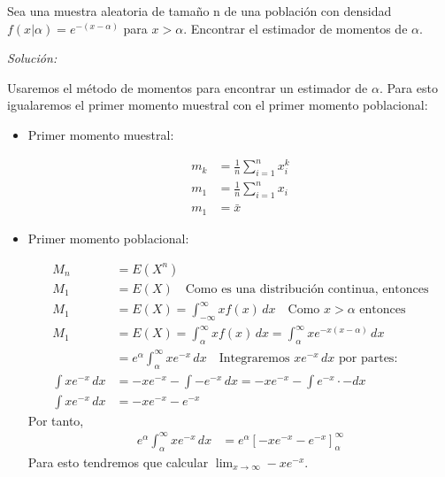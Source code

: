 \documentclass[12pt]{article}
\newenvironment{problem}[2][Problema]{\begin{trivlist}
\item[\hskip \labelsep {\bfseries #1}\hskip \labelsep {\bfseries #2.}]}{\end{trivlist}}
\newenvironment{sol}
    {\emph{Solución:}
    }
    {
    }
\begin{document}




\begin{problem}{I} 
Sea una muestra aleatoria de tamaño n de una población con densidad\\ $f(x|\alpha)=e^{-(x-\alpha)}$ para $x>\alpha$. Encontrar el estimador de momentos de $\alpha$.
\end{problem}
\begin{sol}
Usaremos el método de momentos para encontrar un estimador de $\alpha$. Para esto igualaremos el primer momento muestral con el primer momento poblacional:

\begin{itemize}

\item Primer momento muestral:

\begin{align*}
	m_k &= \frac{1}{n} \sum_{i=1}^{n}x_i^k \\
	m_1 &= \frac{1}{n} \sum_{i=1}^{n}x_i \\
	m_1 &= \bar{x}
\end{align*}
	
\item Primer momento poblacional:

\begin{align*}
    M_n &= E(X^n) \\
    M_1 &= E(X) \quad \text{Como es una distribución continua, entonces} \\
    M_1 &= E(X) = \int_{-\infty}^{\infty} x f(x) \, dx \quad \text{Como }x>\alpha \text{ entonces} \\
    M_1 &= E(X) = \int_{\alpha}^{\infty} x f(x) \, dx = \int_{\alpha}^{\infty} xe^{-x(x-\alpha)} \, dx \\
    &=  e^\alpha \int_{\alpha}^{\infty} xe^{-x} \, dx \quad \text{Integraremos }xe^{-x} \, dx \text{ por partes:} \\
   \int xe^{-x} \, dx  &= -xe^{-x}- \int -e^{-x} \, dx = -xe^{-x}- \int e^{-x} \cdot - dx \\
   \int xe^{-x} \, dx &= -xe^{-x}-e^{-x}
\end{align*}
Por tanto,
\begin{align*}
 e^\alpha \int_{\alpha}^{\infty} xe^{-x} \, dx  &= e^\alpha \left[ -xe^{-x}-e^{-x} \right]_\alpha^\infty
\end{align*}
Para esto tendremos que calcular $\lim_{x \to \infty} -xe^{-x}$. \pagebreak



\end{itemize}
\end{sol}
\end{document}
